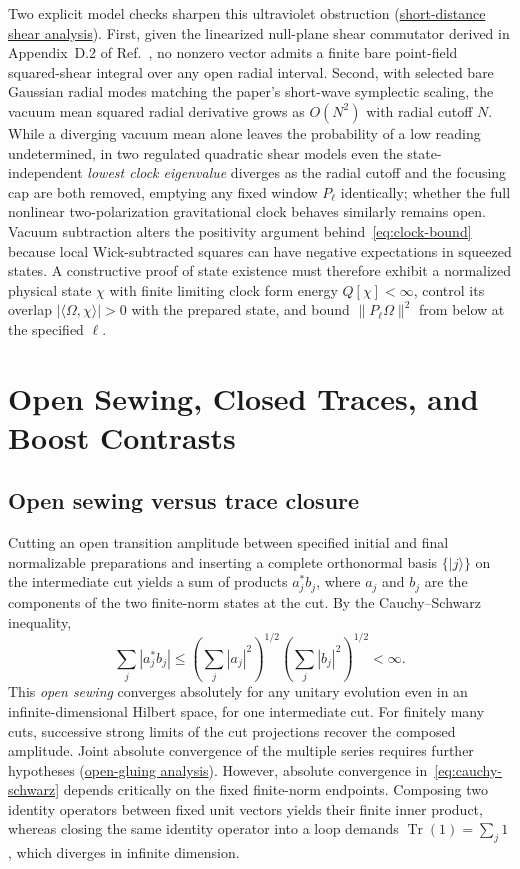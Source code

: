 \documentclass[10pt,a4paper]{article}
\numberwithin{equation}{section}
\newcommand{\repo}[2]{\href{https://github.com/sprajs/quantum-gravity/blob/main/#1}{#2}}
\newcommand{\tr}{\operatorname{Tr}}
\begin{document}
Two explicit model checks sharpen this ultraviolet obstruction (\repo{audit/shear-uv.md}{short-distance shear analysis}).
First, given the linearized null-plane shear commutator derived in Appendix~D.2 of Ref.~\cite{Chandrasekaran2026}, no nonzero vector admits a finite bare point-field squared-shear integral over any open radial interval.
Second, with selected bare Gaussian radial modes matching the paper's short-wave symplectic scaling, the vacuum mean squared radial derivative grows as $O(N^2)$ with radial cutoff $N$.
While a diverging vacuum mean alone leaves the probability of a low reading undetermined, in two regulated quadratic shear models even the state-independent \emph{lowest clock eigenvalue} diverges as the radial cutoff and the focusing cap are both removed, emptying any fixed window $P_\ell$ identically; whether the full nonlinear two-polarization gravitational clock behaves similarly remains open.
Vacuum subtraction alters the positivity argument behind~\eqref{eq:clock-bound} because local Wick-subtracted squares can have negative expectations in squeezed states.
A constructive proof of state existence must therefore exhibit a normalized physical state $\chi$ with finite limiting clock form energy $Q[\chi]<\infty$, control its overlap $|\langle\Omega,\chi\rangle|>0$ with the prepared state, and bound $\|P_\ell\Omega\|^2$ from below at the specified $\ell$.

\section{Open Sewing, Closed Traces, and Boost Contrasts}
\label{sec:sewing}

\subsection{Open sewing versus trace closure}

Cutting an open transition amplitude between specified initial and final normalizable preparations and inserting a complete orthonormal basis $\{|j\rangle\}$ on the intermediate cut yields a sum of products $a_j^* b_j$, where $a_j$ and $b_j$ are the components of the two finite-norm states at the cut.
By the Cauchy--Schwarz inequality,
\begin{equation}
  \sum_j |a_j^* b_j|
  \le \left(\sum_j |a_j|^2\right)^{1/2}
      \left(\sum_j |b_j|^2\right)^{1/2}
  < \infty.
  \label{eq:cauchy-schwarz}
\end{equation}
This \emph{open sewing} converges absolutely for any unitary evolution even in an infinite-dimensional Hilbert space, for one intermediate cut. For finitely many cuts, successive strong limits of the cut projections recover the composed amplitude. Joint absolute convergence of the multiple series requires further hypotheses (\repo{audit/04-gluing.md}{open-gluing analysis}).
However, absolute convergence in~\eqref{eq:cauchy-schwarz} depends critically on the fixed finite-norm endpoints.
Composing two identity operators between fixed unit vectors yields their finite inner product, whereas closing the same identity operator into a loop demands $\tr(1)=\sum_j 1$, which diverges in infinite dimension.
\end{document}
